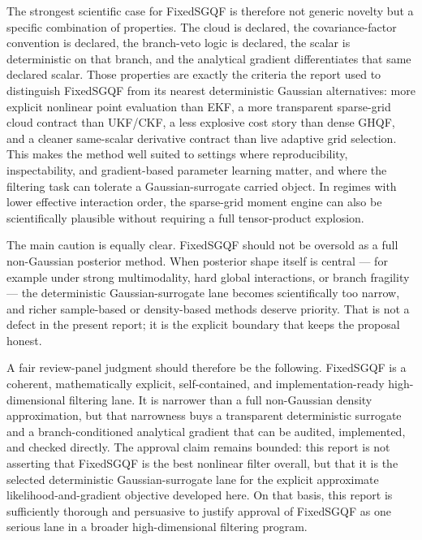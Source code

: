 \documentclass[11pt]{article}
\numberwithin{equation}{section}
\begin{document}
The strongest scientific case for FixedSGQF is therefore not generic novelty but
a specific combination of properties.  The cloud is declared, the
covariance-factor convention is declared, the branch-veto logic is declared, the
scalar is deterministic on that branch, and the analytical gradient
differentiates that same declared scalar.  Those properties are exactly the
criteria the report used to distinguish FixedSGQF from its nearest deterministic
Gaussian alternatives: more explicit nonlinear point evaluation than EKF, a more
transparent sparse-grid cloud contract than UKF/CKF, a less explosive cost story
than dense GHQF, and a cleaner same-scalar derivative contract than live adaptive
grid selection.  This makes the method well suited to settings where
reproducibility, inspectability, and gradient-based parameter learning matter,
and where the filtering task can tolerate a Gaussian-surrogate carried object.
In regimes with lower effective interaction order, the sparse-grid moment engine
can also be scientifically plausible without requiring a full tensor-product
explosion.

The main caution is equally clear.  FixedSGQF should not be oversold as a full
non-Gaussian posterior method.  When posterior shape itself is central --- for
example under strong multimodality, hard global interactions, or branch
fragility --- the deterministic Gaussian-surrogate lane becomes scientifically
too narrow, and richer sample-based or density-based methods deserve priority.
That is not a defect in the present report; it is the explicit boundary that
keeps the proposal honest.

A fair review-panel judgment should therefore be the following.  FixedSGQF is a
coherent, mathematically explicit, self-contained, and implementation-ready
high-dimensional filtering lane.  It is narrower than a full non-Gaussian
density approximation, but that narrowness buys a transparent deterministic
surrogate and a branch-conditioned analytical gradient that can be audited,
implemented, and checked directly.  The approval claim remains bounded: this
report is not asserting that FixedSGQF is the best nonlinear filter overall, but
that it is the selected deterministic Gaussian-surrogate lane for the explicit
approximate likelihood-and-gradient objective developed here.  On that basis,
this report is sufficiently thorough and persuasive to justify approval of
FixedSGQF as one serious lane in a broader high-dimensional filtering program.



\end{document}
